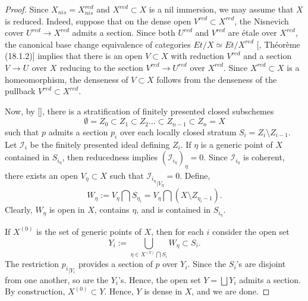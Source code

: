\begin{proof}
    Since $X_{nis}=X_{nis}^{red}$ and $X^{red}\subset X$ is a nil immersion, we may assume that $X$ is reduced. Indeed, suppose that on the dense open $V^{red}\subset X^{red}$, the Nisnevich cover $U^{red}\to X^{red}$ admits a section. Since both $U^{red}$ and $V^{red}$ are étale over $X^{red}$, the canonical base change equivalence of categories $Et/X\simeq Et/{X^{red}}$ [\cite{grothendieck1966elements}, Théorème (18.1.2)] implies that there is an open $V\subset X$ with reduction $V^{red}$ and a section $V^{}\to U^{}$ over $X^{}$ reducing to the section $V^{red}\to U^{red}$ over $X^{red}$. Since $X^{red}\subset X$ is a homeomorphism, the denseness of $V\subset X$ follows from the denseness of the pullback $V^{red}\subset X^{red}$.
    
    Now, by [\cite{hoyois2016trivial}], there is a stratification of finitely presented closed subschemes $$\emptyset=Z_0\subset Z_1 \subset Z_2\dots\subset Z_{n-1}\subset Z_n=X$$ such that $p$ admits a section $p_i$ over each locally closed stratum $S_i=Z_i\setminus Z_{i-1}$. Let $\mathscr{I}_i$ be the finitely presented ideal defining $Z_i$. If $\eta$ is a generic point of $X$ contained in $S_{i_\eta}$, then reducedness implies $(\mathscr{I}_{i_\eta})_{\eta}=0$. Since $\mathscr{I}_{i_\eta}$ is coherent, there exists an open $V_{\eta}\subset X$ such that ${\mathscr{I}_{i_\eta}}_{|V_{\eta}}=0$. Define, $$W_\eta:=V_\eta\bigcap S_{\eta_i}=V_\eta\bigcap (X\setminus Z_{\eta_i-1}).$$ Clearly, $W_\eta$ is open in $X$, contains $\eta$, and is contained in $S_{i_\eta}$. 

    If $X^{(0)}$ is the set of generic points of $X$, then for each $i$ consider the open set $$Y_i:=\bigcup_{\eta\in{X^{(0)}\bigcap S_i}}W_\eta\subset S_i.$$ The restriction ${p_i}_{|Y_i}$ provides a section of $p$ over $Y_i$. Since the $S_i$'s are disjoint from one another, so are the $Y_i$'s. Hence, the open set $Y=\bigsqcup Y_i$ admits a section. By construction, $X^{(0)}\subset Y$. Hence, $Y$ is dense in $X$, and we are done. \end{proof}

